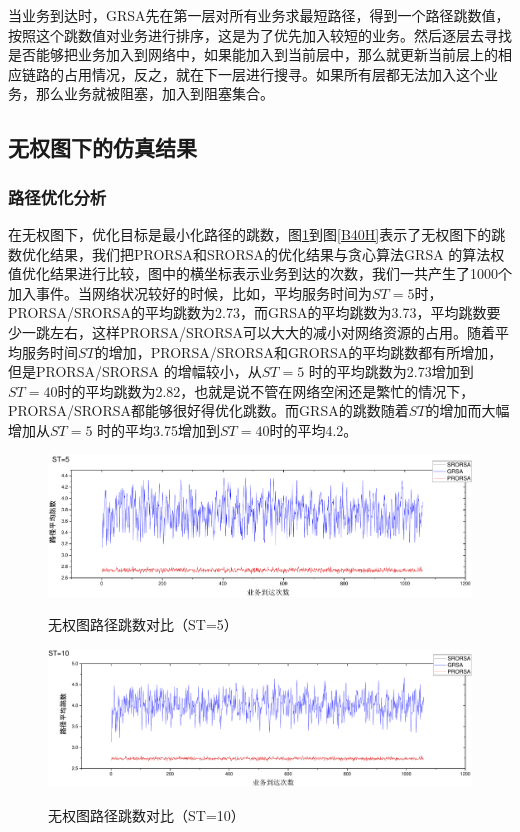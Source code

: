当业务到达时，GRSA先在第一层对所有业务求最短路径，得到一个路径跳数值，按照这个跳数值对业务进行排序，这是为了优先加入较短的业务。然后逐层去寻找是否能够把业务加入到网络中，如果能加入到当前层中，那么就更新当前层上的相应链路的占用情况，反之，就在下一层进行搜寻。如果所有层都无法加入这个业务，那么业务就被阻塞，加入到阻塞集合。
\subsection{无权图下的仿真结果}
\subsubsection{路径优化分析}

在无权图下，优化目标是最小化路径的跳数，图\ref{B5H}到图\ref{B40H}表示了无权图下的跳数优化结果，我们把PRORSA和SRORSA的优化结果与贪心算法GRSA 的算法权值优化结果进行比较，图中的横坐标表示业务到达的次数，我们一共产生了1000个加入事件。当网络状况较好的时候，比如，平均服务时间为$ST=5$时，PRORSA/SRORSA的平均跳数为2.73，而GRSA的平均跳数为3.73，平均跳数要少一跳左右，这样PRORSA/SRORSA可以大大的减小对网络资源的占用。随着平均服务时间$ST$的增加，PRORSA/SRORSA和GRORSA的平均跳数都有所增加，但是PRORSA/SRORSA 的增幅较小，从$ST=5$ 时的平均跳数为2.73增加到$ST=40$时的平均跳数为2.82，也就是说不管在网络空闲还是繁忙的情况下，PRORSA/SRORSA都能够很好得优化跳数。而GRSA的跳数随着$ST$的增加而大幅增加从$ST=5$ 时的平均3.75增加到$ST=40$时的平均4.2。
\begin{figure}
\setlength{\belowcaptionskip}{-0.5cm}
\begin{center}
{\includegraphics[width=1 \textwidth]{figures/B5H.pdf}}
\end{center}
\caption{{\footnotesize{无权图路径跳数对比（ST=5）}}}
\label{B5H}
\end{figure}
\begin{figure}
\setlength{\belowcaptionskip}{-0.5cm}
\begin{center}
{\includegraphics[width=1 \textwidth]{figures/B10H.pdf}}
\end{center}
\caption{{\footnotesize{无权图路径跳数对比（ST=10）}}}
\label{B10H}
\end{figure}
